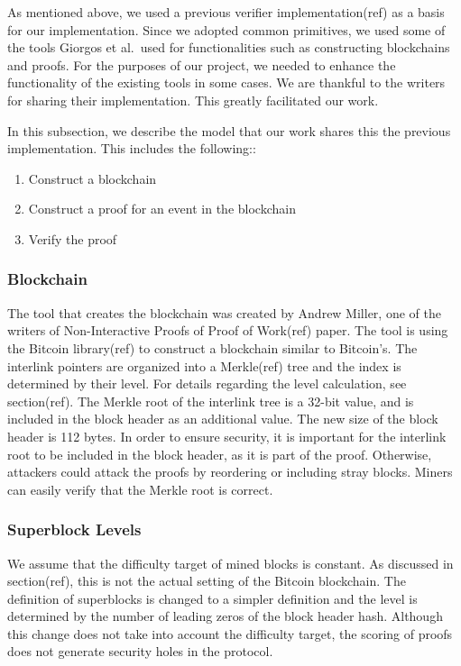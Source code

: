 As mentioned above, we used a previous verifier implementation(ref) as a basis
for our implementation. Since we adopted common primitives, we used some of the
tools Giorgos et al.\ used for functionalities such as constructing blockchains
and proofs. For the purposes of our project, we needed to enhance the
functionality of the existing tools in some cases. We are thankful to the
writers for sharing their implementation. This greatly facilitated our work.

In this subsection, we describe the model that our work shares this the
previous implementation. This includes the following::

\begin{enumerate}
    \item
        Construct a blockchain
    \item
        Construct a proof for an event in the blockchain
    \item
        Verify the proof
\end{enumerate}


\subsubsection{Blockchain}

The tool that creates the blockchain was created by Andrew Miller, one of the
writers of Non-Interactive Proofs of Proof of Work(ref) paper.  The tool is
using the Bitcoin library(ref) to construct a blockchain similar to Bitcoin’s.
The interlink pointers are organized into a Merkle(ref) tree and the index is
determined by their level. For details regarding the level calculation, see
section(ref). The Merkle root of the interlink tree is a 32-bit value, and is
included in the block header as an additional value. The new size of the block
header is 112 bytes. In order to ensure security, it is important for the
interlink root to be included in the block header, as it is part of the proof.
Otherwise, attackers could attack the proofs by reordering or including stray
blocks. Miners can easily verify that the Merkle root is correct.


\subsubsection{Superblock Levels}

We assume that the difficulty target of mined blocks is constant. As discussed
in section(ref), this is not the actual setting of the Bitcoin blockchain. The
definition of superblocks is changed to a simpler definition and the level is
determined by the number of leading zeros of the block header hash. Although
this change does not take into account the difficulty target, the scoring of
proofs does not generate security holes in the protocol.

